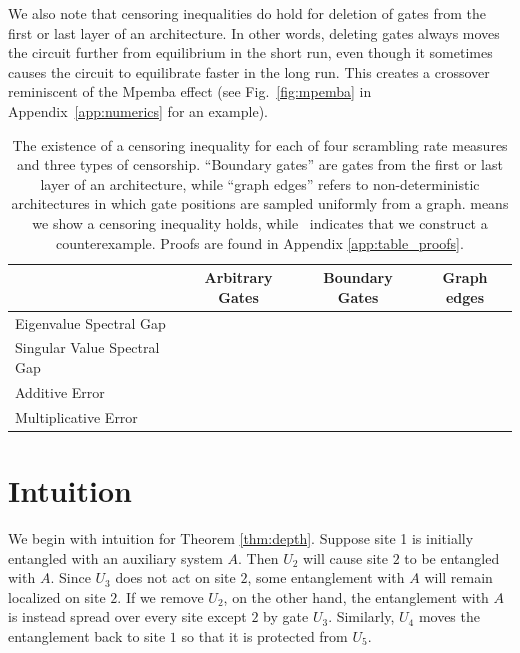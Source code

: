\documentclass[aps,prx,floatfix,nofootinbib,superscriptaddress,longbibliography]{revtex4-2}
\newcommand{\cmark}{\ding{51}}%
\newcommand{\xmark}{\ding{55}}%
\begin{document}
We also note that censoring inequalities do hold for deletion of gates from the first or last layer of an architecture. In other words, deleting gates always moves the circuit further from equilibrium in the short run, even though it sometimes causes the circuit to equilibrate faster in the long run. This creates a crossover reminiscent of the Mpemba effect (see Fig.~\ref{fig:mpemba} in Appendix~\ref{app:numerics} for an example). 


\begin{table}[h]
\label{table:status}
\begin{tabular}{|l|c|c|c|}
\hline
                            & Arbitrary Gates & Boundary Gates & Graph edges \\ \hline
Eigenvalue Spectral Gap     & \xmark             & \xmark             & \xmark          \\ \hline
Singular Value Spectral Gap & \xmark            & \cmark             & \xmark          \\ \hline
Additive Error              & \xmark            & \cmark             & \xmark          \\ \hline
Multiplicative Error        & \xmark            & \cmark             & \xmark          \\ \hline
\end{tabular}
\caption{The existence of a censoring inequality for each of four scrambling rate measures and three types of censorship. ``Boundary gates'' are gates from the first or last layer of an architecture, while ``graph edges'' refers to non-deterministic architectures in which gate positions are sampled uniformly from a graph. \cmark means we show a censoring inequality holds, while \xmark\, indicates that we construct a counterexample. Proofs are found in Appendix \ref{app:table_proofs}.}
\end{table}

\section{Intuition}
\label{section:intuition}
We begin with intuition for Theorem \ref{thm:depth}. Suppose site 1 is initially entangled with an auxiliary system $A$. Then $U_{2}$ will cause site $2$ to be entangled with $A$. Since $U_3$ does not act on site $2$, some entanglement with $A$ will remain localized on site $2$. If we remove $U_{2}$, on the other hand, the entanglement with $A$ is instead spread over every site except $2$ by gate $U_3$. Similarly, $U_4$ moves the entanglement back to site $1$ so that it is protected from $U_5$. 
\end{document}

